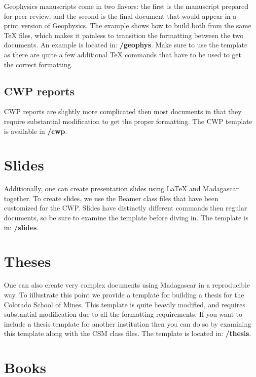 Geophysics manuscripts come in two flavors: the first is the manuscript prepared for peer review, and the second is the final document that would appear in a print version of Geophysics.  The example shows how to build both from the same TeX files, which makes it painless to transition the formatting between the two documents.  An example is located in: \textbf{\exampledir/geophys}.  Make sure to use the template as there are quite a few additional TeX commands that have to be used to get the correct formatting.

\subsection{CWP reports}

CWP reports are slightly more complicated then most documents in that they require substantial modification to get the proper formatting.  The CWP template is available in \textbf{\exampledir/cwp}.  

\section{Slides}

Additionally, one can create presentation slides using LaTeX  and Madagascar together.  To create slides, we use the Beamer class files that have been customized for the CWP.  Slides have distinctly different commands then regular documents, so be sure to examine the template before diving in.  The template is in: \textbf{\exampledir/slides}.  

\section{Theses}

One can also create very complex documents using Madagascar in a reproducible way.  To iillustrate this point we provide a template for building a thesis for the Colorado School of Mines.  This template is quite heavily modified, and requires substantial modification due to all the formatting requirements.  If you want to include a thesis template for another institution then you can do so by examining this template along with the CSM class files.  The template is located in: \textbf{\exampledir/thesis}.

\section{Books}

